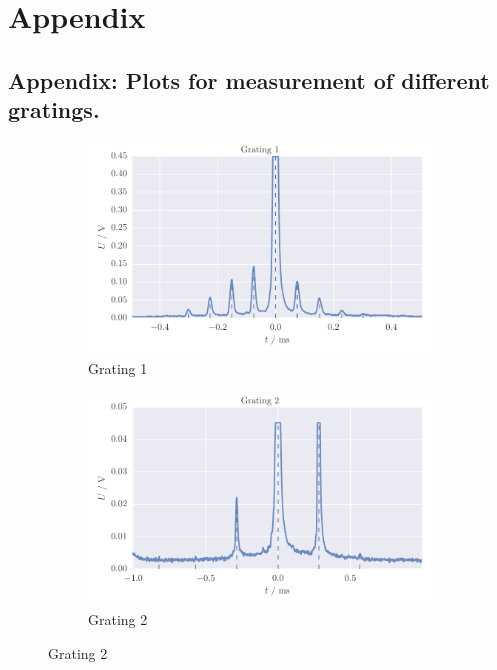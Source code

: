 \section{Appendix}

\subsection{Appendix: Plots for measurement of different gratings.}
\label{sec:appendix_gratings_plots}
\begin{figure}[H]
    \centering
    \begin{subfigure}[b]{\mpltw}
        \includegraphics[width=\textwidth]{figures/gratings_maxi1}
        \caption{Grating 1}
        \label{fig:gratings_maxi1}
    \end{subfigure}\quad
    \begin{subfigure}[b]{\mpltw}
        \includegraphics[width=\textwidth]{figures/gratings_maxi2}
        \caption{Grating 2}
        \label{fig:gratings_maxi1}
    \end{subfigure}

\end{figure}
